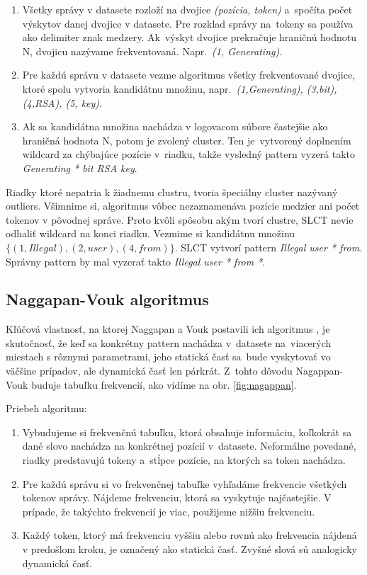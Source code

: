 \begin{enumerate}
  \item Všetky správy v datasete rozloží na dvojice \emph{(pozícia, token)} a~spo\-čí\-ta počet výskytov danej dvojice v datasete. Pre rozklad správy na~tokeny sa používa ako delimiter znak medzery. Ak~výskyt dvojice prekračuje hraničnú hodnotu N, dvojicu nazývame frek\-ventovaná. Napr.~\emph{(1, Generating)}.
  \item Pre každú správu v datasete vezme algoritmus všetky frek\-ventované dvojice, ktoré spolu vytvoria kandidátnu množinu, napr.~\emph{{(1,Generating), (3,bit), (4,RSA), (5, key)}}.
  \item Ak sa kandidátna množina nachádza v logovacom súbore častejšie ako hraničná hodnota N, potom je zvolený cluster. Ten je~vyt\-vorený doplnením wildcard za chýbajúce pozície v~riad\-ku, takže vysledný pattern vyzerá takto \emph{Generating * bit RSA key}.
\end{enumerate}

Riadky ktoré nepatria k žiadnemu clustru, tvoria špeciálny cluster nazývaný outliers. Všimnime si, algoritmus vôbec nezaznamenáva pozície medzier ani počet tokenov v pôvodnej správe. Preto kvôli spôsobu akým tvorí clustre, SLCT nevie odhaliť wildcard na konci riadku. Vezmime si kandidátnu množinu $\{(1,Illegal), (2,user), (4,from)\} $. SLCT vytvorí pattern \emph{Illegal user * from}. Správny pattern by mal vyzerať takto  \emph{Illegal user * from *}.

\subsection{Naggapan-Vouk algoritmus}
Kľúčová vlastnosť, na ktorej Naggapan a Vouk postavili ich algoritmus \parencite{nagappanvouk}, je skutočnosť, že keď sa konkrétny pattern nachádza v~datasete na~viacerých miestach s rôznymi parametrami, jeho statická časť sa~bude vyskytovať vo väčšine prípadov, ale dynamická časť len párkrát. Z~tohto dôvodu Nagappan-Vouk buduje tabuľku frekvencií, ako vidíme na obr. \ref{fig:nagappan}.
\par Priebeh algoritmu:

\begin{enumerate}
  \item Vybudujeme si frekvenčnú tabuľku, ktorá obsahuje informáciu, koľkokrát sa dané slovo nachádza na konkrétnej pozícií v~datasete. Neformálne povedané, riadky predstavujú tokeny a~stĺpce pozície, na ktorých sa token nachádza.
  \item Pre každú správu si vo frekvenčnej tabuľke vyhľadáme frekvencie všetkých tokenov správy. Nájdeme frekvenciu, ktorá sa vyskytuje najčastejšie. V prípade, že takýchto frekvencií je viac, použijeme nižšiu frekvenciu.
  \item Každý token, ktorý má frekvenciu vyššiu alebo rovnú ako frekvencia nájdená v predošlom kroku, je označený ako statická časť. Zvyšné slová sú analogicky dynamická časť.
\end{enumerate}

